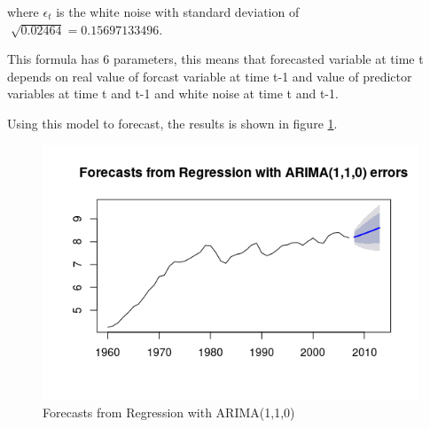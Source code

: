 \documentclass[journal, a4paper]{IEEEtran}
\begin{document}
where $\epsilon_{t}$ is the white noise with standard deviation of $\sqrt[]{0.02464}=0.15697133496$.


This formula has 6 parameters, this means that forecasted variable at time t depends on real value of forcast variable at time t-1 and value of predictor variables at time t and t-1 and white noise at time t and t-1. 

Using this model to forecast, the results is shown in figure \ref{fig2:arima_forecast}.


\begin{figure}[H]
\begin{center}
\includegraphics[scale=0.4]{fig2/arima_forecast.png}
\caption{Forecasts from Regression with ARIMA(1,1,0)}
\label{fig2:arima_forecast}
\end{center}
\end{figure}
\end{document}
